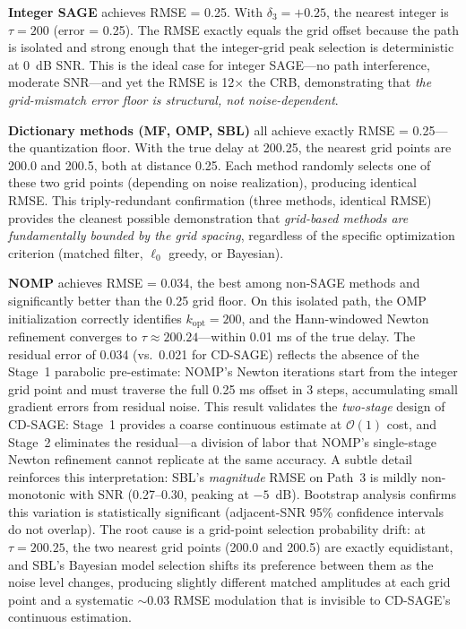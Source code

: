 \documentclass[a4paper,fleqn]{cas-dc}
\begin{document}
\textbf{Integer SAGE} achieves RMSE = 0.25. With $\delta_3 = +0.25$, the nearest integer is $\tau = 200$ (error = 0.25). The RMSE exactly equals the grid offset because the path is isolated and strong enough that the integer-grid peak selection is deterministic at 0~dB SNR. This is the ideal case for integer SAGE---no path interference, moderate SNR---and yet the RMSE is 12$\times$ the CRB, demonstrating that \textit{the grid-mismatch error floor is structural, not noise-dependent}.

\textbf{Dictionary methods (MF, OMP, SBL)} all achieve exactly RMSE = 0.25---the quantization floor. With the true delay at 200.25, the nearest grid points are 200.0 and 200.5, both at distance 0.25. Each method randomly selects one of these two grid points (depending on noise realization), producing identical RMSE. This triply-redundant confirmation (three methods, identical RMSE) provides the cleanest possible demonstration that \textit{grid-based methods are fundamentally bounded by the grid spacing}, regardless of the specific optimization criterion (matched filter, $\ell_0$ greedy, or Bayesian).

\textbf{NOMP} achieves RMSE = 0.034, the best among non-SAGE methods and significantly better than the 0.25 grid floor. On this isolated path, the OMP initialization correctly identifies $k_{\text{opt}} = 200$, and the Hann-windowed Newton refinement converges to $\tau \approx 200.24$---within 0.01 ms of the true delay. The residual error of 0.034 (vs.\ 0.021 for CD-SAGE) reflects the absence of the Stage~1 parabolic pre-estimate: NOMP's Newton iterations start from the integer grid point and must traverse the full 0.25 ms offset in 3 steps, accumulating small gradient errors from residual noise. This result validates the \textit{two-stage} design of CD-SAGE: Stage~1 provides a coarse continuous estimate at $\mathcal{O}(1)$ cost, and Stage~2 eliminates the residual---a division of labor that NOMP's single-stage Newton refinement cannot replicate at the same accuracy. A subtle detail reinforces this interpretation: SBL's \textit{magnitude} RMSE on Path~3 is mildly non-monotonic with SNR (0.27--0.30, peaking at $-5$~dB). Bootstrap analysis confirms this variation is statistically significant (adjacent-SNR 95\% confidence intervals do not overlap). The root cause is a grid-point selection probability drift: at $\tau=200.25$, the two nearest grid points (200.0 and 200.5) are exactly equidistant, and SBL's Bayesian model selection shifts its preference between them as the noise level changes, producing slightly different matched amplitudes at each grid point and a systematic $\sim$0.03 RMSE modulation that is invisible to CD-SAGE's continuous estimation.
\end{document}
